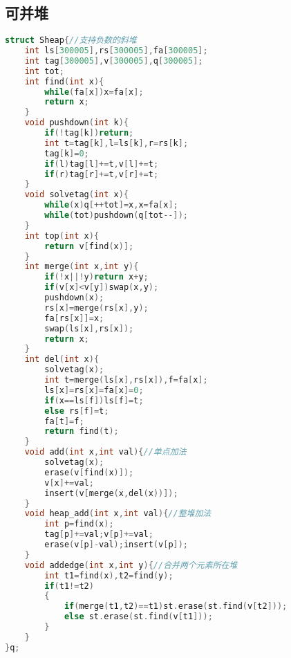 \subsection{可并堆}
\begin{lstlisting}[language=C] 
struct Sheap{//支持负数的斜堆
	int ls[300005],rs[300005],fa[300005];
	int tag[300005],v[300005],q[300005];
	int tot;
	int find(int x){
		while(fa[x])x=fa[x];
		return x;
	}
	void pushdown(int k){
		if(!tag[k])return;
		int t=tag[k],l=ls[k],r=rs[k];
		tag[k]=0;
		if(l)tag[l]+=t,v[l]+=t;
		if(r)tag[r]+=t,v[r]+=t;
	}
	void solvetag(int x){
		while(x)q[++tot]=x,x=fa[x]; 
		while(tot)pushdown(q[tot--]);
	}
	int top(int x){
		return v[find(x)];
	}
	int merge(int x,int y){
		if(!x||!y)return x+y;
		if(v[x]<v[y])swap(x,y);
		pushdown(x);
		rs[x]=merge(rs[x],y);
		fa[rs[x]]=x;
		swap(ls[x],rs[x]);
		return x;
	}
    int del(int x){
		solvetag(x);
		int t=merge(ls[x],rs[x]),f=fa[x];
		ls[x]=rs[x]=fa[x]=0;
		if(x==ls[f])ls[f]=t;
		else rs[f]=t;
		fa[t]=f;
		return find(t);
	}
	void add(int x,int val){//单点加法
	    solvetag(x);
		erase(v[find(x)]);
		v[x]+=val;
		insert(v[merge(x,del(x))]);
	}
	void heap_add(int x,int val){//整堆加法
		int p=find(x);
		tag[p]+=val;v[p]+=val;
		erase(v[p]-val);insert(v[p]);
	}
	void addedge(int x,int y){//合并两个元素所在堆
		int t1=find(x),t2=find(y);
		if(t1!=t2)
		{
			if(merge(t1,t2)==t1)st.erase(st.find(v[t2]));
			else st.erase(st.find(v[t1]));
		}
	}
}q;
\end{lstlisting}